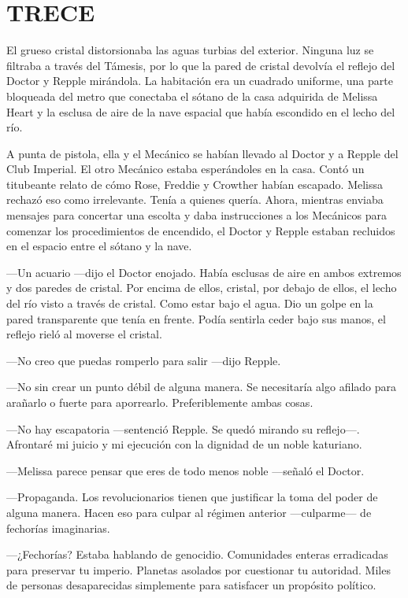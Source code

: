 \chapter*{TRECE}

{El grueso cristal distorsionaba las aguas turbias del exterior. Ninguna
	luz se filtraba a través del Támesis, por lo que la pared de cristal
	devolvía el reflejo del Doctor y Repple mirándola. La habitación era un
	cuadrado uniforme, una parte bloqueada del metro que conectaba el sótano
	de la casa adquirida de Melissa Heart y la esclusa de aire de la nave
espacial que había escondido en el lecho del río.}

{A punta de pistola, ella y el Mecánico se habían llevado al Doctor y a
	Repple del Club Imperial. El otro Mecánico estaba esperándoles en la
	casa. Contó un titubeante relato de cómo Rose, Freddie y Crowther habían
	escapado. Melissa rechazó eso como irrelevante. Tenía a quienes quería.
	Ahora, mientras enviaba mensajes para concertar una escolta y daba
	instrucciones a los Mecánicos para comenzar los procedimientos de
	encendido, el Doctor y Repple estaban recluidos en el espacio entre el
sótano y la nave.}

{---Un acuario ---dijo el Doctor enojado. Había esclusas de aire en
	ambos extremos y dos paredes de cristal. Por encima de ellos, cristal,
	por debajo de ellos, el lecho del río visto a través de cristal. Como
	estar bajo el agua. Dio un golpe en la pared transparente que tenía en
	frente. Podía sentirla ceder bajo sus manos, el reflejo rieló al moverse
el cristal.}

{---No creo que puedas romperlo para salir ---dijo Repple.}

{---No sin crear un punto débil de alguna manera. Se necesitaría algo
	afilado para arañarlo o fuerte para aporrearlo. Preferiblemente ambas
cosas.}

{---No hay escapatoria ---sentenció Repple. Se quedó mirando su
	reflejo---. Afrontaré mi juicio y mi ejecución con la dignidad de un
noble katuriano.}

{---Melissa parece pensar que eres de todo menos noble ---señaló el
Doctor.}

{---Propaganda. Los revolucionarios tienen que justificar la toma del
	poder de alguna manera. Hacen eso para culpar al régimen anterior
---culparme--- de fechorías imaginarias.}

{---¿Fechorías? Estaba hablando de genocidio. Comunidades enteras
	erradicadas para preservar tu imperio. Planetas asolados por cuestionar
	tu autoridad. Miles de personas desaparecidas simplemente para
satisfacer un propósito político.}

